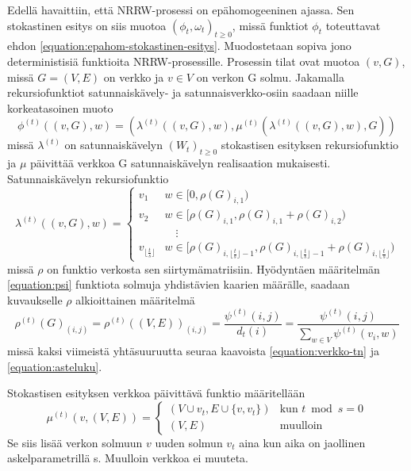 \documentclass[finnish, 12pt, a4paper, sci, utf8, pdfa]{aaltothesis}
\begin{document}
Edellä havaittiin, että NRRW-prosessi on epähomogeeninen ajassa. Sen stokastinen esitys on siis muotoa \( (\phi_{t}, \omega_{t})_{t \geq 0} \), missä funktiot \( \phi_{t} \) toteuttavat ehdon \ref{equation:epahom-stokastinen-esitys}. Muodostetaan sopiva jono deterministisiä funktioita NRRW-prosessille. Prosessin tilat ovat muotoa \( (v, G) \), missä \( G = (V, E) \) on verkko ja \( v \in V \) on verkon G solmu. Jakamalla rekursiofunktiot satunnaiskävely- ja satunnaisverkko-osiin saadaan niille korkeatasoinen muoto
\begin{equation}
   \phi^{(t)} \left( (v, G), w \right) = \left( \lambda^{(t)} \left( (v, G), w \right), \mu^{(t)} \left( \lambda^{(t)} \left( (v, G), w \right), G \right) \right)
\end{equation}
missä \( \lambda^{(t)} \) on satunnaiskävelyn \( (W_{t})_{t \geq 0} \) stokastisen esityksen rekursiofunktio ja \( \mu \) päivittää verkkoa G satunnaiskävelyn realisaation mukaisesti. Satunnaiskävelyn rekursiofunktio
\begin{equation}
   \lambda^{(t)} \left( (v, G), w \right) = 
   \begin{cases}
      v_{1} & w \in [0, \rho(G)_{i,1}) \\
      v_{2} & w \in [\rho(G)_{i,1}, \rho(G)_{i,1} + \rho(G)_{i,2}) \\
            & \quad \vdots \\
      v_{\lfloor \frac{t}{s} \rfloor} & w \in [\rho(G)_{i,\lfloor \frac{t}{s} \rfloor - 1}, \rho(G)_{i,\lfloor \frac{t}{s} \rfloor - 1} + \rho(G)_{i,\lfloor \frac{t}{s} \rfloor}) 
   \end{cases}
\end{equation}
missä \( \rho \) on funktio verkosta sen siirtymämatriisiin. Hyödyntäen määritelmän \ref{equation:psi} funktiota solmuja yhdistävien kaarien määrälle, saadaan kuvaukselle \( \rho \) alkioittainen määritelmä
\begin{equation}
   \rho^{(t)}(G)_{(i,j)} = \rho^{(t)} \left( (V, E) \right)_{(i,j)} = \frac{\psi^{(t)}(i, j)}{d_{t}(i)} = \frac{\psi^{(t)}(i, j)}{\sum_{w \in V} \psi^{(t)}(v_{i}, w)}
\end{equation}
missä kaksi viimeistä yhtäsuuruutta seuraa kaavoista \ref{equation:verkko-tn} ja \ref{equation:asteluku}.

Stokastisen esityksen verkkoa päivittävä funktio määritellään
\begin{equation}
   \mu^{(t)} \left( v, (V, E) \right) =
   \begin{cases}
      \left( V \cup {v_{t}}, E \cup \{ v, v_{t} \} \right) & \text{kun } t \bmod s = 0 \\
      \left( V, E \right) & \text{muulloin}
   \end{cases}
\end{equation}
Se siis lisää verkon solmuun \( v \) uuden solmun \( v_{t} \) aina kun aika on jaollinen askelparametrillä s. Muulloin verkkoa ei muuteta.
\end{document}
